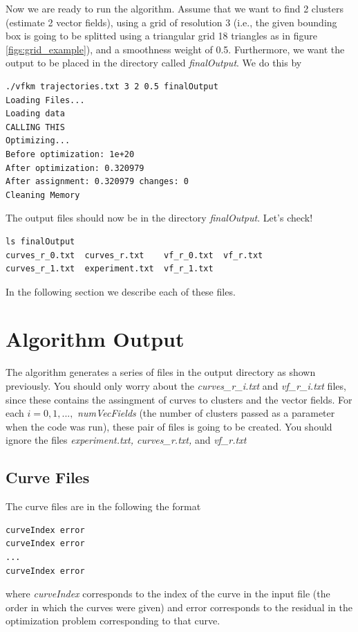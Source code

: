 \documentclass[10pt]{article}
\begin{document}
Now we are ready to run the algorithm. Assume that we want to find 2 clusters
(estimate 2 vector fields), using a grid of resolution 3 (i.e., the given bounding box 
is going to be splitted using a triangular grid 18 triangles as in figure \ref{figs:grid_example}), and a smoothness weight
of 0.5. Furthermore, we want the output to be placed in the directory called \emph{finalOutput}.
We do this by

\begin{lstlisting}
./vfkm trajectories.txt 3 2 0.5 finalOutput
Loading Files...
Loading data
CALLING THIS
Optimizing...
Before optimization: 1e+20
After optimization: 0.320979
After assignment: 0.320979 changes: 0
Cleaning Memory
\end{lstlisting}

The output files should now be in the directory \emph{finalOutput}. Let's check!

\begin{lstlisting}
ls finalOutput
curves_r_0.txt  curves_r.txt    vf_r_0.txt  vf_r.txt
curves_r_1.txt  experiment.txt  vf_r_1.txt
\end{lstlisting}

In the following section we describe each of these files.

\section{Algorithm Output}\label{sec:output_format}
The algorithm generates a series of files in the output directory as shown previously.
You should only worry about the \emph{curves\_r\_i.txt} and \emph{vf\_r\_i.txt} files, since
these contains the assingment of curves to clusters and the vector fields. For each $i=0,1,...,$ \emph{numVecFields} (the number of clusters passed as a parameter when the code was run), these
pair of files is going to be created. You should ignore the files \emph{experiment.txt, curves\_r.txt,} and \emph{vf\_r.txt}

\subsection{Curve Files}
The curve files are in the following the format

\begin{lstlisting}
curveIndex error
curveIndex error
...
curveIndex error
\end{lstlisting}

where \emph{curveIndex} corresponds to the index of the curve in the
input file (the order in which the curves were given) and error
corresponds to the residual in the optimization problem corresponding
to that curve. 
\end{document}
